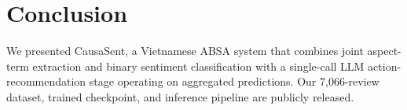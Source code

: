 \documentclass[conference]{IEEEtran}
\begin{document}
\section{Conclusion}

We presented CausaSent, a Vietnamese ABSA system that combines joint
aspect-term extraction and binary sentiment classification with a
single-call LLM action-recommendation stage operating on aggregated
predictions. Our 7{,}066-review dataset, trained checkpoint, and
inference pipeline are publicly released.



\end{document}
